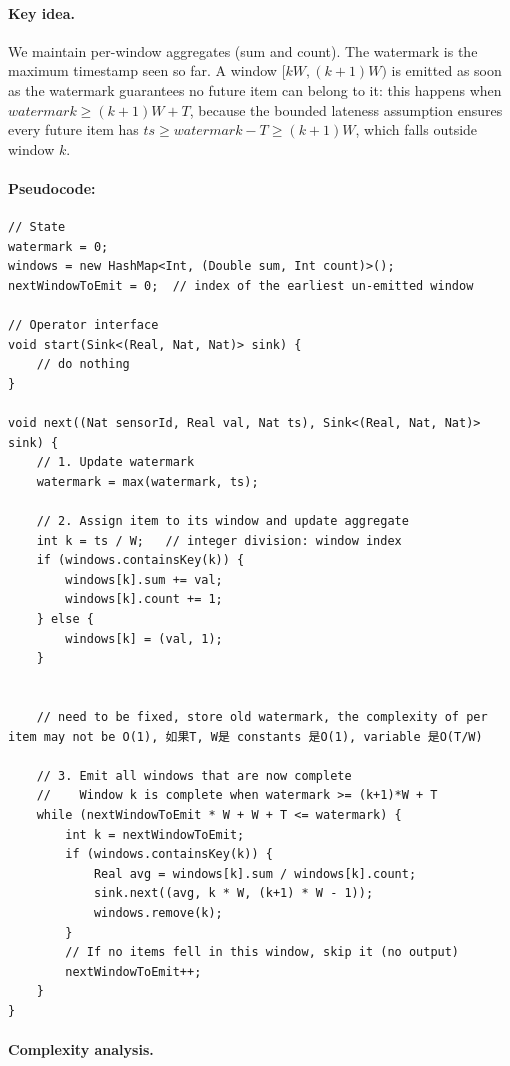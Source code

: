 \documentclass[11pt]{article}
\theoremstyle{definition}
\newcommand{\ts}{\mathit{ts}}
\begin{document}
\paragraph{Key idea.} We maintain per-window aggregates (sum and count). The watermark is the maximum timestamp seen so far. A window $[kW, (k{+}1)W)$ is emitted as soon as the watermark guarantees no future item can belong to it: this happens when $\mathit{watermark} \geq (k{+}1)W + T$, because the bounded lateness assumption ensures every future item has $\ts \geq \mathit{watermark} - T \geq (k{+}1)W$, which falls outside window $k$.

\paragraph{Pseudocode:}
\begin{verbatim}
// State
watermark = 0;
windows = new HashMap<Int, (Double sum, Int count)>();
nextWindowToEmit = 0;  // index of the earliest un-emitted window

// Operator interface
void start(Sink<(Real, Nat, Nat)> sink) {
    // do nothing
}

void next((Nat sensorId, Real val, Nat ts), Sink<(Real, Nat, Nat)> sink) {
    // 1. Update watermark
    watermark = max(watermark, ts);

    // 2. Assign item to its window and update aggregate
    int k = ts / W;   // integer division: window index
    if (windows.containsKey(k)) {
        windows[k].sum += val;
        windows[k].count += 1;
    } else {
        windows[k] = (val, 1);
    }


	// need to be fixed, store old watermark, the complexity of per item may not be O(1), 如果T, W是 constants 是O(1), variable 是O(T/W)

    // 3. Emit all windows that are now complete
    //    Window k is complete when watermark >= (k+1)*W + T
    while (nextWindowToEmit * W + W + T <= watermark) {
        int k = nextWindowToEmit;
        if (windows.containsKey(k)) {
            Real avg = windows[k].sum / windows[k].count;
            sink.next((avg, k * W, (k+1) * W - 1));
            windows.remove(k);
        }
        // If no items fell in this window, skip it (no output)
        nextWindowToEmit++;
    }
}
\end{verbatim}

\paragraph{Complexity analysis.}
\end{document}
